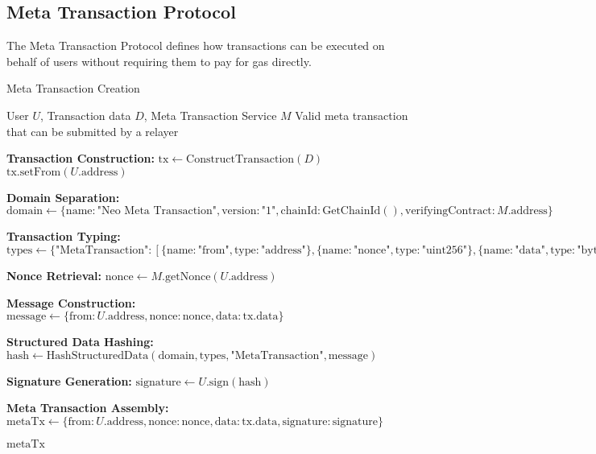 \subsection{Meta Transaction Protocol}
\label{subsec:meta-tx-protocol}

The Meta Transaction Protocol defines how transactions can be executed on behalf of users without requiring them to pay for gas directly.

\begin{tcolorbox}[
    enhanced,
    colback=blue!5!white,
    colframe=blue!75!black,
    arc=5mm,
    boxrule=1.5pt,
    title=Meta Transaction Creation Protocol,
    fonttitle=\bfseries,
    coltitle=white,
    attach boxed title to top left={yshift=-2mm, xshift=5mm},
    boxed title style={colback=blue!75!black, rounded corners},
    shadow={2mm}{-2mm}{0mm}{black!50},
    drop fuzzy shadow
]
\begin{protocol}{Meta Transaction Creation}
\label{prot:meta-tx-creation}
\begin{algorithmic}[1]
\Require User $U$, Transaction data $D$, Meta Transaction Service $M$
\Ensure Valid meta transaction that can be submitted by a relayer

\State \textbf{Transaction Construction:}
\State $\text{tx} \gets \text{ConstructTransaction}(D)$
\State $\text{tx}.\text{setFrom}(U.\text{address})$

\State \textbf{Domain Separation:}
\State $\text{domain} \gets \{\text{name}: \text{"Neo Meta Transaction"}, \text{version}: \text{"1"}, \text{chainId}: \text{GetChainId}(), \text{verifyingContract}: M.\text{address}\}$

\State \textbf{Transaction Typing:}
\State $\text{types} \gets \{\text{"MetaTransaction"}: [\{\text{name}: \text{"from"}, \text{type}: \text{"address"}\}, \{\text{name}: \text{"nonce"}, \text{type}: \text{"uint256"}\}, \{\text{name}: \text{"data"}, \text{type}: \text{"bytes"}\}]\}$

\State \textbf{Nonce Retrieval:}
\State $\text{nonce} \gets M.\text{getNonce}(U.\text{address})$

\State \textbf{Message Construction:}
\State $\text{message} \gets \{\text{from}: U.\text{address}, \text{nonce}: \text{nonce}, \text{data}: \text{tx}.\text{data}\}$

\State \textbf{Structured Data Hashing:}
\State $\text{hash} \gets \text{HashStructuredData}(\text{domain}, \text{types}, \text{"MetaTransaction"}, \text{message})$

\State \textbf{Signature Generation:}
\State $\text{signature} \gets U.\text{sign}(\text{hash})$

\State \textbf{Meta Transaction Assembly:}
\State $\text{metaTx} \gets \{\text{from}: U.\text{address}, \text{nonce}: \text{nonce}, \text{data}: \text{tx}.\text{data}, \text{signature}: \text{signature}\}$

\State \Return $\text{metaTx}$
\end{algorithmic}
\end{protocol}
\end{tcolorbox}

